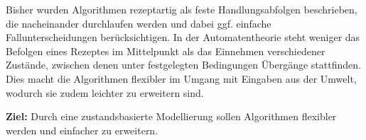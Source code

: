
Bisher wurden Algorithmen rezeptartig als feste Handlungsabfolgen beschrieben, die nacheinander durchlaufen werden und dabei ggf. einfache Fallunterscheidungen berücksichtigen. In der Automatentheorie steht weniger das Befolgen eines Rezeptes im Mittelpunkt als das Einnehmen verschiedener Zustände, zwischen denen unter festgelegten Bedingungen Übergänge stattfinden. Dies macht die Algorithmen flexibler im Umgang mit Eingaben aus der Umwelt, wodurch sie zudem leichter zu erweitern sind.

\begin{ziel}
	\textbf{Ziel:} Durch eine zustandsbasierte Modellierung sollen Algorithmen flexibler werden und einfacher zu erweitern. 
\end{ziel}

